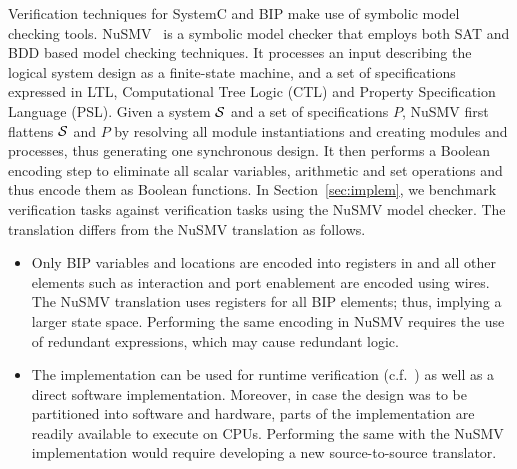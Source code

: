 Verification techniques for SystemC and BIP make use of symbolic model checking tools. 
NuSMV~\cite{nusmv} is a symbolic model checker that employs both 
SAT and BDD based model checking techniques. It processes an input 
describing the logical system design as a finite-state machine, and a set of specifications
expressed in LTL, Computational Tree Logic (CTL) and Property Specification Language (PSL).
Given a system $\mathcal{S}$ and a set of specifications $P$, NuSMV first flattens $\mathcal{S}$ and $P$ by 
resolving all module instantiations and creating modules and processes, thus generating one 
synchronous design. It then performs a Boolean encoding step to eliminate all scalar variables, 
arithmetic and set operations and thus encode them as Boolean functions.
In Section~\ref{sec:implem}, we benchmark \biptool{} verification tasks 
against verification tasks using the NuSMV model checker. 
The \caig translation differs from the NuSMV translation as follows. 
%
\begin{itemize}
  \item
Only BIP variables and locations are encoded into registers in 
\caig and all 
other elements such as interaction and port enablement  
are encoded using wires. 
The NuSMV translation uses registers for all BIP elements;
thus, implying a larger state space. 
Performing the same encoding in NuSMV requires the use of redundant 
expressions, which may cause redundant logic. 
\item 
%
%
 The implementation can be used for runtime verification (c.f.~\cite{FalconeHR13}) as well as a direct
 software implementation.  
 Moreover, in case the design was to be partitioned into software and hardware, 
 parts of the implementation are readily available to execute on CPUs. 
 Performing the same with the NuSMV implementation would require developing 
 a new source-to-source translator. 
\end{itemize}


